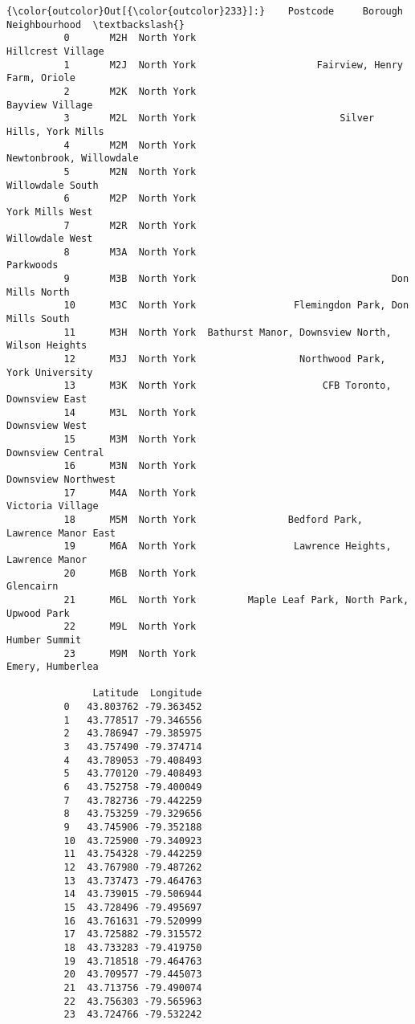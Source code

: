 \documentclass[11pt]{article}
\begin{document}
\begin{Verbatim}[commandchars=\\\{\}]
{\color{outcolor}Out[{\color{outcolor}233}]:}    Postcode     Borough                                    Neighbourhood  \textbackslash{}
          0       M2H  North York                                Hillcrest Village   
          1       M2J  North York                     Fairview, Henry Farm, Oriole   
          2       M2K  North York                                  Bayview Village   
          3       M2L  North York                         Silver Hills, York Mills   
          4       M2M  North York                          Newtonbrook, Willowdale   
          5       M2N  North York                                 Willowdale South   
          6       M2P  North York                                  York Mills West   
          7       M2R  North York                                  Willowdale West   
          8       M3A  North York                                        Parkwoods   
          9       M3B  North York                                  Don Mills North   
          10      M3C  North York                 Flemingdon Park, Don Mills South   
          11      M3H  North York  Bathurst Manor, Downsview North, Wilson Heights   
          12      M3J  North York                  Northwood Park, York University   
          13      M3K  North York                      CFB Toronto, Downsview East   
          14      M3L  North York                                   Downsview West   
          15      M3M  North York                                Downsview Central   
          16      M3N  North York                              Downsview Northwest   
          17      M4A  North York                                 Victoria Village   
          18      M5M  North York                Bedford Park, Lawrence Manor East   
          19      M6A  North York                 Lawrence Heights, Lawrence Manor   
          20      M6B  North York                                        Glencairn   
          21      M6L  North York         Maple Leaf Park, North Park, Upwood Park   
          22      M9L  North York                                    Humber Summit   
          23      M9M  North York                                 Emery, Humberlea   
          
               Latitude  Longitude  
          0   43.803762 -79.363452  
          1   43.778517 -79.346556  
          2   43.786947 -79.385975  
          3   43.757490 -79.374714  
          4   43.789053 -79.408493  
          5   43.770120 -79.408493  
          6   43.752758 -79.400049  
          7   43.782736 -79.442259  
          8   43.753259 -79.329656  
          9   43.745906 -79.352188  
          10  43.725900 -79.340923  
          11  43.754328 -79.442259  
          12  43.767980 -79.487262  
          13  43.737473 -79.464763  
          14  43.739015 -79.506944  
          15  43.728496 -79.495697  
          16  43.761631 -79.520999  
          17  43.725882 -79.315572  
          18  43.733283 -79.419750  
          19  43.718518 -79.464763  
          20  43.709577 -79.445073  
          21  43.713756 -79.490074  
          22  43.756303 -79.565963  
          23  43.724766 -79.532242  
\end{Verbatim}
\end{document}
